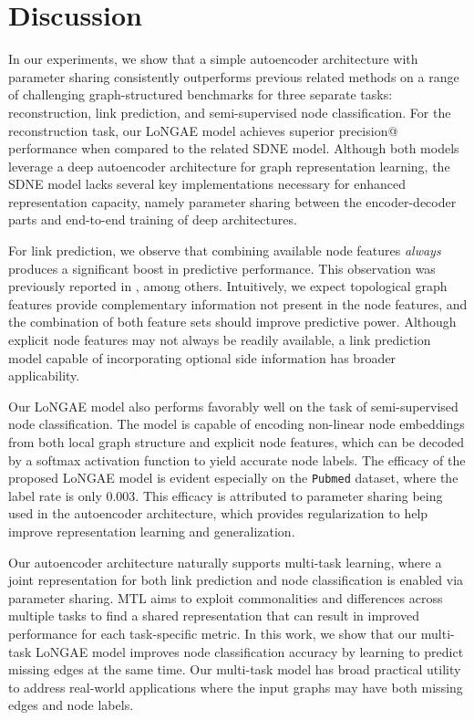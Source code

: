 \documentclass[letterpaper, conference]{IEEEtran}
\begin{document}
\section{Discussion}
In our experiments, we show that a simple autoencoder architecture with parameter sharing consistently outperforms previous related methods on a range of challenging graph-structured benchmarks for three separate tasks: reconstruction, link prediction, and semi-supervised node classification. For the reconstruction task, our LoNGAE model achieves superior precision@ performance when compared to the related SDNE model. Although both models leverage a deep autoencoder architecture for graph representation learning, the SDNE model lacks several key implementations necessary for enhanced representation capacity, namely parameter sharing between the encoder-decoder parts and end-to-end training of deep architectures.

For link prediction, we observe that combining available node features \emph{always} produces a significant boost in predictive performance. This observation was previously reported in \cite{Menon:2011,VGAE:2016}, among others. Intuitively, we expect topological graph features provide complementary information not present in the node features, and the combination of both feature sets should improve predictive power. Although explicit node features may not always be readily available, a link prediction model capable of incorporating optional side information has broader applicability.

Our LoNGAE model also performs favorably well on the task of semi-supervised node classification. The model is capable of encoding non-linear node embeddings from both local graph structure and explicit node features, which can be decoded by a softmax activation function to yield accurate node labels. The efficacy of the proposed LoNGAE model is evident especially on the \texttt{Pubmed} dataset, where the label rate is only 0.003. This efficacy is attributed to parameter sharing being used in the autoencoder architecture, which provides regularization to help improve representation learning and generalization.

Our autoencoder architecture naturally supports multi-task learning, where a joint representation for both link prediction and node classification is enabled via parameter sharing. MTL aims to exploit commonalities and differences across multiple tasks to find a shared representation that can result in improved performance for each task-specific metric. In this work, we show that our multi-task LoNGAE model improves node classification accuracy by learning to predict missing edges at the same time. Our multi-task model has broad practical utility to address real-world applications where the input graphs may have both missing edges and node labels.
\end{document}
